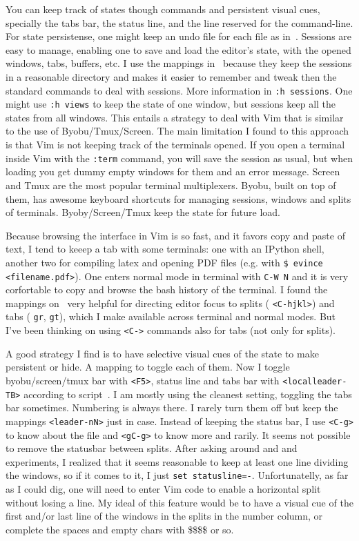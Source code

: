 \documentclass{article}
\newcommand{\ttt}[1] {
	\texttt{<#1>}}
\newcommand{\tttt}[1] {
	\texttt{#1}}
\begin{document}
You can keep track of states though commands and persistent visual
cues, specially the tabs bar, the status line, and the line
reserved for the command-line.
For state persistense, one might keep an undo file for each file as
in~\cite{vimrc}.
Sessions are easy to manage, enabling one to save and load the
editor's state, with the opened windows, tabs, buffers, etc.
I use the mappings in~\cite{vimrc} because they keep the sessions
in a reasonable directory and makes it easier to remember and tweak
then the standard commands to deal with sessions.
More information in \tttt{:h sessions}.
One might use \tttt{:h views} to keep the state of one window,
but sessions keep all the states from all windows.
This entails a strategy to deal with Vim that is similar to
the use of Byobu/Tmux/Screen.
The main limitation I found to this approach is that
Vim is not keeping track of the terminals opened.
If you open a terminal inside Vim with the \tttt{:term}
command, you will save the session as usual, but when loading
you get dummy empty windows for them and an error message.
Screen and Tmux are the most popular terminal multiplexers.
Byobu, built on top of them, has awesome keyboard shortcuts
for managing sessions, windows and splits of terminals.
Byoby/Screen/Tmux keep the state for future load.

Because browsing the interface in Vim is so fast,
and it favors copy and paste of text,
I tend to keeep a tab with some terminals:
one with an IPython shell, another two for compiling latex
and opening PDF files (e.g. with \tttt{\$ evince <filename.pdf>}).
One enters normal mode in terminal with \tttt{C-W N}
and it is very corfortable to copy and browse the bash history of the
terminal.
I found the mappings on~\cite{vimrc} very helpful for directing
editor focus to splits (\ttt{C-hjkl}) and tabs (\tttt{gr}, \tttt{gt}),
which I make available across terminal and normal modes.
But I've been thinking on using \ttt{C-} commands also
for tabs (not only for splits).

A good strategy I find is to have selective visual cues of the state to make persistent or hide. A mapping to toggle each of them.
Now I toggle byobu/screen/tmux bar with \ttt{F5},
status line and tabs bar with \ttt{localleader-TB} according to script~\cite{vimrc}.
I am mostly using the cleanest setting, toggling the tabs bar sometimes. Numbering is always there. I rarely turn them off but keep the mappings \ttt{leader-nN} just in case.
Instead of keeping the status bar, I use \ttt{C-g} to know about the
file and \ttt{gC-g} to know more and rarily.
It seems not possible to remove the statusbar between splits.
After asking around and and experiments, I realized that it seems
reasonable to keep at least one line dividing the windows, so
if it comes to it, I just \tttt{set statusline=-}.
Unfortunatelly, as far as I could dig, one will need to enter
Vim code to enable a horizontal split without losing a line.
My ideal of this feature would be to have a visual cue of the
first and/or last line of the windows in the splits in the number
column, or complete the spaces and empty chars with \$\$\$\$ or so.
\end{document}

